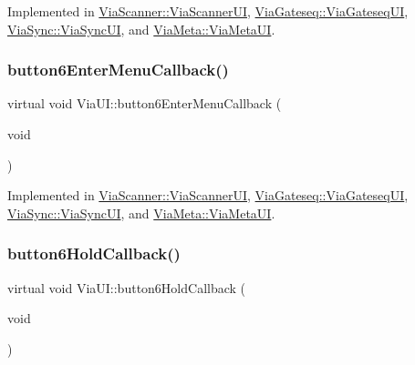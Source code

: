 Implemented in \mbox{\hyperlink{class_via_scanner_1_1_via_scanner_u_i_a10bef1a488e628c198e07bc56690199c}{Via\+Scanner\+::\+Via\+Scanner\+UI}}, \mbox{\hyperlink{class_via_gateseq_1_1_via_gateseq_u_i_a0622c45ab381c9bde60480781f90981c}{Via\+Gateseq\+::\+Via\+Gateseq\+UI}}, \mbox{\hyperlink{class_via_sync_1_1_via_sync_u_i_aee833fdc4c2d1e242c1ece302dcaca1b}{Via\+Sync\+::\+Via\+Sync\+UI}}, and \mbox{\hyperlink{class_via_meta_1_1_via_meta_u_i_afab19acc66940324991525af8527d6d9}{Via\+Meta\+::\+Via\+Meta\+UI}}.

\mbox{\label{class_via_u_i_ae59e7ff3a6ba1f641a4a916e47a26513}} 
\subsubsection{\texorpdfstring{button6\+Enter\+Menu\+Callback()}{button6EnterMenuCallback()}}
{\footnotesize\ttfamily virtual void Via\+U\+I\+::button6\+Enter\+Menu\+Callback (\begin{DoxyParamCaption}\item[{void}]{ }\end{DoxyParamCaption})\hspace{0.3cm}{\ttfamily [pure virtual]}}



Implemented in \mbox{\hyperlink{class_via_scanner_1_1_via_scanner_u_i_a94de9ec6e40e16ba7dd8dc0ffb9adc14}{Via\+Scanner\+::\+Via\+Scanner\+UI}}, \mbox{\hyperlink{class_via_gateseq_1_1_via_gateseq_u_i_adf289572ed287fdc4c9ff4029f008b7b}{Via\+Gateseq\+::\+Via\+Gateseq\+UI}}, \mbox{\hyperlink{class_via_sync_1_1_via_sync_u_i_a114ee3916efcf43b16f6265151350e15}{Via\+Sync\+::\+Via\+Sync\+UI}}, and \mbox{\hyperlink{class_via_meta_1_1_via_meta_u_i_a5bcffdfe679b51dbcac0e78dc093c29b}{Via\+Meta\+::\+Via\+Meta\+UI}}.

\mbox{\label{class_via_u_i_afa66f7946b6cf755b94383715b26a651}} 
\subsubsection{\texorpdfstring{button6\+Hold\+Callback()}{button6HoldCallback()}}
{\footnotesize\ttfamily virtual void Via\+U\+I\+::button6\+Hold\+Callback (\begin{DoxyParamCaption}\item[{void}]{ }\end{DoxyParamCaption})\hspace{0.3cm}{\ttfamily [pure virtual]}}



